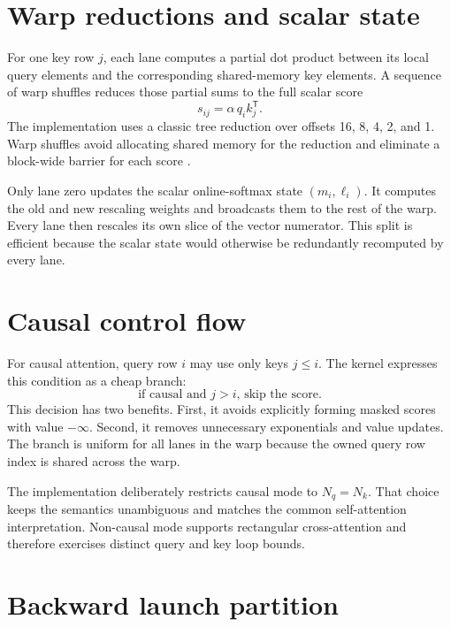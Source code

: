 \section{Warp reductions and scalar state}

For one key row $j$, each lane computes a partial dot product between its local query elements and the corresponding shared-memory key elements. A sequence of warp shuffles reduces those partial sums to the full scalar score
\begin{equation}
  s_{ij} = \alpha\, q_i k_j^{\mathsf T}.
\end{equation}
The implementation uses a classic tree reduction over offsets 16, 8, 4, 2, and 1. Warp shuffles avoid allocating shared memory for the reduction and eliminate a block-wide barrier for each score \citep{nvidia2026programming}.

Only lane zero updates the scalar online-softmax state $(m_i,\ell_i)$. It computes the old and new rescaling weights and broadcasts them to the rest of the warp. Every lane then rescales its own slice of the vector numerator. This split is efficient because the scalar state would otherwise be redundantly recomputed by every lane.

\section{Causal control flow}

For causal attention, query row $i$ may use only keys $j\le i$. The kernel expresses this condition as a cheap branch:
\begin{equation}
  \text{if causal and } j > i \text{, skip the score.}
\end{equation}
This decision has two benefits. First, it avoids explicitly forming masked scores with value $-\infty$. Second, it removes unnecessary exponentials and value updates. The branch is uniform for all lanes in the warp because the owned query row index is shared across the warp.

The implementation deliberately restricts causal mode to $N_q=N_k$. That choice keeps the semantics unambiguous and matches the common self-attention interpretation. Non-causal mode supports rectangular cross-attention and therefore exercises distinct query and key loop bounds.

\section{Backward launch partition}

